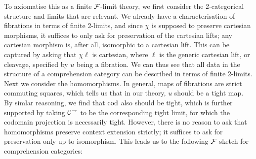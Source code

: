 \documentclass[../thesis.tex]{subfiles}
\begin{document}
To axiomatise this as a finite ${\mathcal{F}}$-limit theory, we first consider the 2-categorical structure and limits that
are relevant. We already have a characterisation of fibrations in terms of finite 2-limits, and since $\chi$ is
supposed to preserve cartesian morphisms, it suffices to only ask for preservation of the cartesian lifts; any
cartesian morphism is, after all, isomorphic to a cartesian lift. This can be captured by asking that $\chi\ell$
is cartesian, where $\ell$ is the generic cartesian lift, or cleavage, specified by $u$ being a fibration. We can
thus see that all data in the structure of a comprehension category can be described in terms of finite 2-limits.
Next we consider the homomorphisms. In general, maps of fibrations are strict commuting squares, which tells us
that in our theory, $u$ should be a tight map. By simlar reasoning, we find that ${\mathrm{cod}}$ also should be tight, which
is further supported by taking ${\mathcal{C}}^\to$ to be the corresponding tight limit, for which the codomain projection is
necessarily tight. However, there
is no reason to ask that homomorphisms preserve context extension strictly; it suffices to ask for preservation
only up to isomorphism. This leads us to the following ${\mathcal{F}}$-sketch for comprehension categories:
\end{document}
